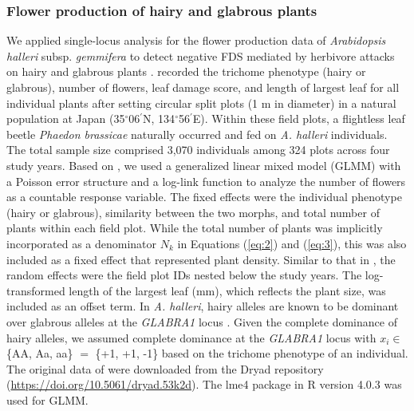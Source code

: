 \documentclass[12pt,]{article}
\begin{document}
\subsubsection{Flower production of hairy and glabrous plants}
We applied single-locus analysis for the flower production data of \textit{Arabidopsis halleri} subsp. \textit{gemmifera} to detect negative FDS mediated by herbivore attacks on hairy and glabrous plants \citep{sato2017herbivore}. \cite{sato2017herbivore} recorded the trichome phenotype (hairy or glabrous), number of flowers, leaf damage score, and length of largest leaf for all individual plants after setting circular split plots (1 m in diameter) in a natural population at Japan (35$^\circ$06$^\prime$N, 134$^\circ$56$^\prime$E). Within these field plots, a flightless leaf beetle \textit{Phaedon brassicae} naturally occurred and fed on \textit{A. halleri} individuals. The total sample size comprised 3,070 individuals among 324 plots across four study years. Based on \cite{sato2017herbivore}, we used a generalized linear mixed model (GLMM) with a Poisson error structure and a log-link function to analyze the number of flowers as a countable response variable. The fixed effects were the individual phenotype (hairy or glabrous), similarity between the two morphs, and total number of plants within each field plot. While the total number of plants was implicitly incorporated as a denominator $N_k$ in Equations (\ref{eq:2}) and (\ref{eq:3}), this was also included as a fixed effect that represented plant density. Similar to that in \cite{sato2017herbivore}, the random effects were the field plot IDs nested below the study years. The log-transformed length of the largest leaf (mm), which reflects the plant size, was included as an offset term. In \textit{A. halleri}, hairy alleles are known to be dominant over glabrous alleles at the \textit{GLABRA1} locus \citep{shimizu2002ecology, kawagoe2011coexistence}. Given the complete dominance of hairy alleles, we assumed complete dominance at the \textit{GLABRA1} locus with $x_i \in$ \{AA, Aa, aa\} $=$ \{+1, +1, -1\} based on the trichome phenotype of an individual. The original data of \cite{sato2017herbivore} were downloaded from the Dryad repository (\url{https://doi.org/10.5061/dryad.53k2d}). The lme4 package \citep{bates2015} in R version 4.0.3 \citep{R_citation} was used for GLMM.
\end{document}
